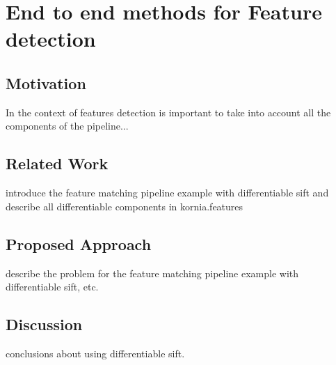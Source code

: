 \chapter[End to end methods for Feature detection]{End to end methods for Feature detection}
\label{chap:chap_04}
\vspace{-8mm}

\section{Motivation}

In the context of features detection is important to take into account all the components of the pipeline...

\section{Related Work}

introduce the feature matching pipeline example with differentiable sift and describe all differentiable components in kornia.features

\section{Proposed Approach}

describe the problem for the feature matching pipeline example with differentiable sift, etc.

\section{Discussion}

conclusions about using differentiable sift.
